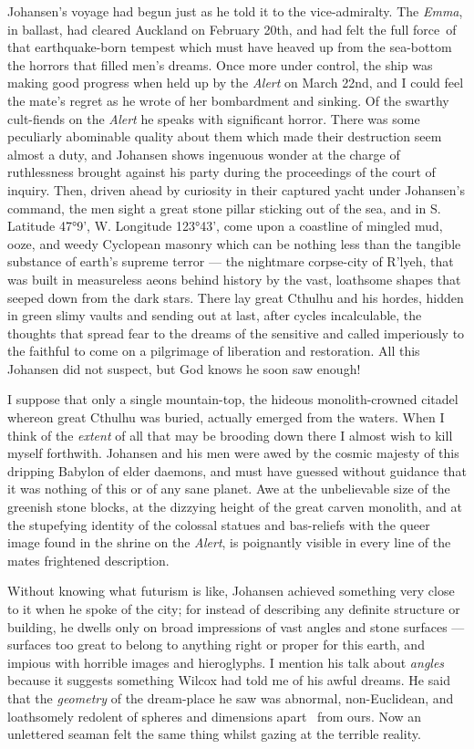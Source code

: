 Johansen's voyage had begun just as he told it to the vice-admiralty.
The \emph{Emma}, in ballast, had cleared Auckland on February 20th, and had
felt the full force\est\ of that earthquake-born tempest which must have
heaved up from the sea-bottom the horrors that filled men's dreams. Once
more under control, the ship was making good progress when held up by
the \emph{Alert} on March 22nd, and I could feel the mate's regret as he wrote
of her bombardment and sinking. Of the swarthy cult-fiends on the \emph{Alert}
he speaks with significant horror. There was some peculiarly abominable
quality about them which made their destruction seem almost a duty, and
Johansen shows ingenuous wonder at the charge of ruthlessness brought
against his party during the proceedings of the court of inquiry. Then,
driven ahead by curiosity in their captured yacht under Johansen's
command, the men sight a great stone pillar sticking out of the sea, and
in S. Latitude 47°9', W. Longitude 123°43', come upon a coastline of
mingled mud, ooze, and weedy Cyclopean masonry which can be nothing less
than the tangible substance of earth's supreme terror --- the nightmare
corpse-city of R'lyeh, that was built in measureless aeons behind
history by the vast, loathsome shapes that seeped down from the dark
stars. There lay great Cthulhu and his hordes, hidden in green slimy
vaults and sending out at last, after cycles incalculable, the thoughts
that spread fear to the dreams of the sensitive and called imperiously
to the faithful to come on a pilgrimage of liberation and restoration.
All this Johansen did not suspect, but God knows he soon saw enough!

I suppose that only a single mountain-top, the hideous monolith-crowned
citadel whereon great Cthulhu was buried, actually emerged from the
waters. When I think of the \emph{extent} of all that may be brooding down
there I almost wish to kill myself forthwith. Johansen and his men were
awed by the cosmic majesty of this dripping Babylon of elder daemons,
and must have guessed without guidance that it was nothing of this or of
any sane planet. Awe at the unbelievable size of the greenish stone
blocks, at the dizzying height of the great carven monolith, and at the
stupefying identity of the colossal statues and bas-reliefs with the
queer image found in the shrine on the \emph{Alert}, is poignantly visible in
every line of the mates frightened description.

Without knowing what futurism is like, Johansen achieved something very
close to it when he spoke of the city; for instead of describing any
definite structure or building, he dwells only on broad impressions of
vast angles and stone surfaces --- surfaces too great to belong to
anything right or proper for this earth, and impious with horrible
images and hieroglyphs. I mention his talk about \emph{angles} because it
suggests something Wilcox had told me of his awful dreams. He said that
the \emph{geometry} of the dream-place he saw was abnormal, non-Euclidean, and
loathsomely redolent of spheres and dimensions apart \est\ from ours. Now an
unlettered seaman felt the same thing whilst gazing at the terrible
reality.

